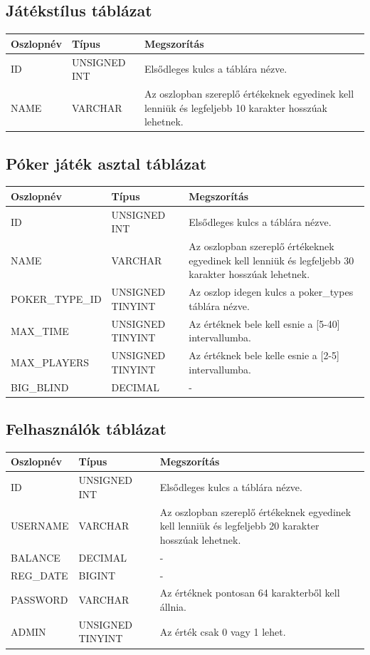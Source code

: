 \subsection{Játékstílus táblázat}
\begin{tabular}{| C{3.8cm} | C{4.2cm} | C{6.1cm} |}
\hline
 \textbf{Oszlopnév} & \textbf{Típus} & \textbf{Megszorítás} \\ \hline
  ID & UNSIGNED INT & Elsődleges kulcs a táblára nézve. \\ \hline
  NAME & VARCHAR & Az oszlopban szereplő értékeknek egyedinek kell lenniük és legfeljebb 10 karakter hosszúak lehetnek.  \\ \hline
\end{tabular}

\subsection{Póker játék asztal táblázat}
\begin{tabular}{| C{3.8cm} | C{4.2cm} | C{6.1cm} |}
\hline
 \textbf{Oszlopnév} & \textbf{Típus} & \textbf{Megszorítás} \\ \hline
  ID & UNSIGNED INT & Elsődleges kulcs a táblára nézve. \\ \hline
  NAME & VARCHAR & Az oszlopban szereplő értékeknek egyedinek kell lenniük és legfeljebb 30 karakter hosszúak lehetnek.  \\ \hline
  POKER\_TYPE\_ID & UNSIGNED TINYINT & Az oszlop idegen kulcs a poker\_types táblára nézve. \\ \hline
  MAX\_TIME & UNSIGNED TINYINT & Az értéknek bele kell esnie a [5-40] intervallumba. \\ \hline
  MAX\_PLAYERS & UNSIGNED TINYINT & Az értéknek bele kelle esnie a [2-5] intervallumba. \\ \hline
  BIG\_BLIND & DECIMAL & - \\ \hline
\end{tabular}

\subsection{Felhasználók táblázat}
\begin{tabular}{| C{3.8cm} | C{4.2cm} | C{6.1cm} |}
\hline
 \textbf{Oszlopnév} & \textbf{Típus} & \textbf{Megszorítás} \\ \hline
  ID & UNSIGNED INT & Elsődleges kulcs a táblára nézve. \\ \hline
  USERNAME & VARCHAR & Az oszlopban szereplő értékeknek egyedinek kell lenniük és legfeljebb 20 karakter hosszúak lehetnek.  \\ \hline
  BALANCE & DECIMAL & - \\ \hline
  REG\_DATE & BIGINT & - \\ \hline
  PASSWORD & VARCHAR & Az értéknek pontosan 64 karakterből kell állnia. \\ \hline
  ADMIN & UNSIGNED TINYINT & Az érték csak 0 vagy 1 lehet. \\ \hline
\end{tabular}

